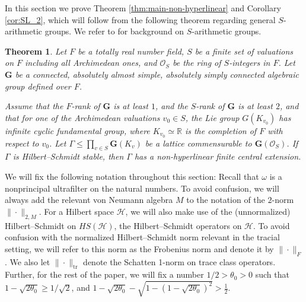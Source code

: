 \documentclass[11pt]{amsart}
\DeclareMathOperator{\tr}{tr}
\DeclareMathOperator{\SL}{SL}
\newcommand{\R}{{\mathbb{R}}}
\newcommand{\Z}{{\mathbb{Z}}}
\newcommand{\cH}{{\mathcal{H}}}
\newcommand{\bG}{{\mathbf{G}}}
\newtheorem{theorem}{Theorem}[section]
\theoremstyle{definition}
\theoremstyle{remark}
\theoremstyle{definition}
\begin{document}
%   
In this section we prove Theorem \ref{thm:main-non-hyperlinear} and  Corollary \ref{cor:SL_2}, which will follow from the following theorem regarding general $S$-arithmetic groups.
We refer to \cite{margulis1991discrete, Witte} for background on $S$-arithmetic groups.
\begin{theorem}
    \label{thm:main_S_arith}
    Let $F$ be a totally real number field, $S$ be a finite set of valuations on $F$ including all Archimedean ones, and $\mathcal O_S$ be the ring of $S$-integers in $F$.
    Let $\bG$ be a connected, absolutely almost simple, absolutely simply connected algebraic group defined over $F$. 
    
    Assume that the $F$-rank of $\bG$ is at least $1$, and the $S$-rank of $\bG$ is at least $2$, and that for one of the Archimedean valuations $v_0 \in S$, the Lie group $G(K_{v_0})$ has infinite cyclic fundamental group, where  $K_{v_0} \simeq \R$ is the completion of $F$ with respect to $v_0$.
    Let $\Gamma \leq \prod_{v \in S} \bG(K_v)$ be a lattice commensurable to $\bG(\mathcal O_S)$.
    If $\Gamma$ is Hilbert--Schmidt stable, then $\Gamma$ has a non-hyperlinear finite central extension.
\end{theorem}

We will fix the following notation throughout this section:
Recall that $\omega$ is a nonprincipal ultrafilter on the natural numbers. 
To avoid confusion, we will always add the relevant von Neumann algebra $M$ to the notation of the $2$-norm $\| \cdot \|_{2,M}$.
For a Hilbert space $\cH$, we will also make use of the (unnormalized) Hilbert--Schmidt on $HS(\cH)$, the Hilbert--Schmidt operators on $\cH$. To avoid confusion with the normalized Hilbert--Schmidt norm relevant in the tracial setting, we will refer to this norm as the Frobenius norm and denote it by $\| \cdot \|_{F}$. We also let $\| \cdot\|_{\tr}$ denote the Schatten 1-norm on trace class operators.
Further, for the rest of the paper, we will fix a number $1/2 > \theta_0 > 0$ such that $1 -\sqrt{2\theta_0} \geq 1/\sqrt{2}$, and $1 - \sqrt{2\theta_0} -\sqrt{1-(1-\sqrt{2\theta_0})^2} > \frac{1}{2}$.
\end{document}

